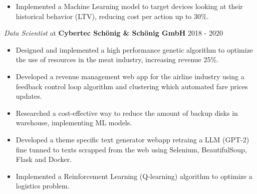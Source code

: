 \documentclass[margin]{res}
\begin{document}
\begin{resume}
\begin{itemize}
        \item Implemented a Machine Learning model to target devices looking at their
            historical behavior (LTV), reducing cost per action up to 30\%.
    \end{itemize}
    {\sl Data Scientist} at {\bf Cybertec Sch\"onig \& Sch\"onig GmbH} \hfill 2018 - 2020
    \begin{itemize}  \itemsep -2pt %
        \item Designed and implemented a high performance genetic 
            algorithm to optimize the use of resources in the meat industry, increasing revenue 25\%.
        \item Developed a revenue management web app for the airline industry 
            using a feedback control loop algorithm and clustering which automated fare prices updates.
        \item Researched a cost-effective way to reduce the amount of 
		     backup disks in warehouse, implementing ML models. 
         \item Developed a theme specific text generator webapp retraing a LLM (GPT-2) fine tunned to 
             texts scrapped from the web using Selenium, BeautifulSoup, Flask and Docker.
        \item Implemented a Reinforcement Learning (Q-learning) algorithm 
            to optimize a logistics problem.
    \end{itemize}
		


\end{resume}
\end{document}
